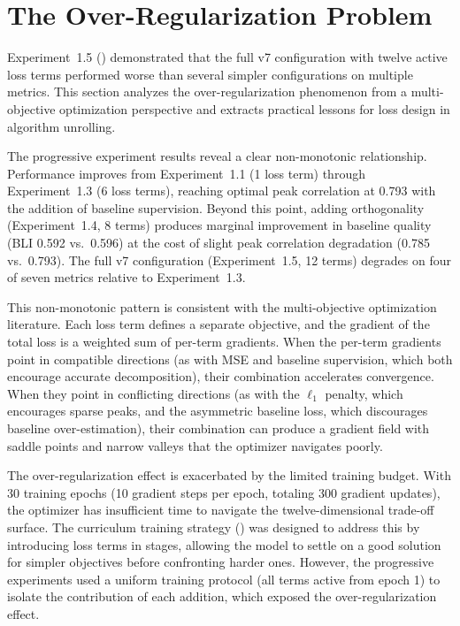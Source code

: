 \section{The Over-Regularization Problem}
\label{sec:disc_overreg}

Experiment~1.5 () demonstrated that the full v7 configuration with twelve active loss terms performed worse than several simpler configurations on multiple metrics. This section analyzes the over-regularization phenomenon from a multi-objective optimization perspective and extracts practical lessons for loss design in algorithm unrolling.

The progressive experiment results reveal a clear non-monotonic relationship. Performance improves from Experiment~1.1 (1 loss term) through Experiment~1.3 (6 loss terms), reaching optimal peak correlation at 0.793 with the addition of baseline supervision. Beyond this point, adding orthogonality (Experiment~1.4, 8 terms) produces marginal improvement in baseline quality (BLI 0.592 vs.\ 0.596) at the cost of slight peak correlation degradation (0.785 vs.\ 0.793). The full v7 configuration (Experiment~1.5, 12 terms) degrades on four of seven metrics relative to Experiment~1.3.

This non-monotonic pattern is consistent with the multi-objective optimization literature. Each loss term defines a separate objective, and the gradient of the total loss is a weighted sum of per-term gradients. When the per-term gradients point in compatible directions (as with MSE and baseline supervision, which both encourage accurate decomposition), their combination accelerates convergence. When they point in conflicting directions (as with the $\ell_1$ penalty, which encourages sparse peaks, and the asymmetric baseline loss, which discourages baseline over-estimation), their combination can produce a gradient field with saddle points and narrow valleys that the optimizer navigates poorly.

The over-regularization effect is exacerbated by the limited training budget. With 30 training epochs (10 gradient steps per epoch, totaling 300 gradient updates), the optimizer has insufficient time to navigate the twelve-dimensional trade-off surface. The curriculum training strategy () was designed to address this by introducing loss terms in stages, allowing the model to settle on a good solution for simpler objectives before confronting harder ones. However, the progressive experiments used a uniform training protocol (all terms active from epoch 1) to isolate the contribution of each addition, which exposed the over-regularization effect.

